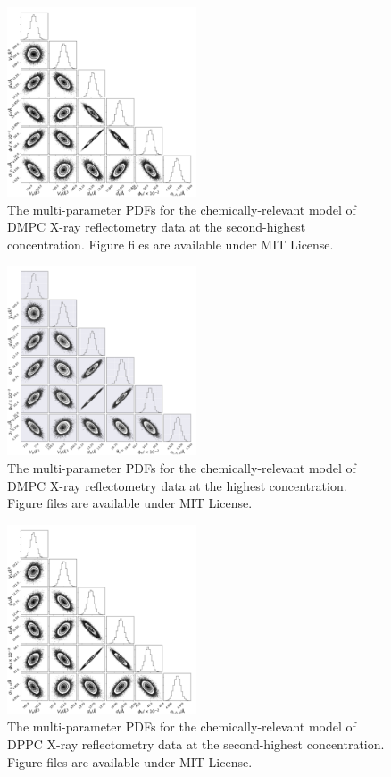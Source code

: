 \documentclass[11pt,a4paper]{article}
\begin{document}
\begin{figure}
	\centering
	\includegraphics[width=0.50\textwidth]{figures/dmpc4_all_corner}
	\caption{The multi-parameter PDFs for the chemically-relevant model of DMPC X-ray reflectometry data at the second-highest concentration. Figure files are available under MIT License.\cite{mccluskey_2018}}
	\label{fig:dmpc4}
\end{figure}
\begin{figure}
	\centering
	\includegraphics[width=0.50\textwidth]{figures/dmpc5_all_corner}
	\caption{The multi-parameter PDFs for the chemically-relevant model of DMPC X-ray reflectometry data at the highest concentration. Figure files are available under MIT License.\cite{mccluskey_2018}}
	\label{fig:dmpc5}
\end{figure}
\begin{figure}
	\centering
	\includegraphics[width=0.50\textwidth]{figures/dppc4_all_corner}
	\caption{The multi-parameter PDFs for the chemically-relevant model of DPPC X-ray reflectometry data at the second-highest concentration. Figure files are available under MIT License.\cite{mccluskey_2018}}
	\label{fig:dppc4}
\end{figure}
\end{document}

